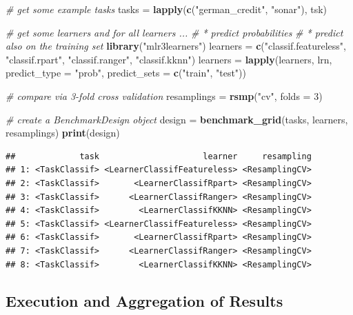 \documentclass[]{scrbook}
\newenvironment{Shaded}{\begin{snugshade}}{\end{snugshade}}
\newcommand{\CommentTok}[1]{\textcolor[rgb]{0.56,0.35,0.01}{\textit{#1}}}
\newcommand{\DataTypeTok}[1]{\textcolor[rgb]{0.13,0.29,0.53}{#1}}
\newcommand{\DecValTok}[1]{\textcolor[rgb]{0.00,0.00,0.81}{#1}}
\newcommand{\KeywordTok}[1]{\textcolor[rgb]{0.13,0.29,0.53}{\textbf{#1}}}
\newcommand{\NormalTok}[1]{#1}
\newcommand{\StringTok}[1]{\textcolor[rgb]{0.31,0.60,0.02}{#1}}
\renewenvironment{Shaded} {\begin{snugshade}\small} {\end{snugshade}}
\begin{document}
\begin{Shaded}
\begin{Highlighting}[]
\CommentTok{# get some example tasks}
\NormalTok{tasks =}\StringTok{ }\KeywordTok{lapply}\NormalTok{(}\KeywordTok{c}\NormalTok{(}\StringTok{"german_credit"}\NormalTok{, }\StringTok{"sonar"}\NormalTok{), tsk)}

\CommentTok{# get some learners and for all learners ...}
\CommentTok{# * predict probabilities}
\CommentTok{# * predict also on the training set}
\KeywordTok{library}\NormalTok{(}\StringTok{"mlr3learners"}\NormalTok{)}
\NormalTok{learners =}\StringTok{ }\KeywordTok{c}\NormalTok{(}\StringTok{"classif.featureless"}\NormalTok{, }\StringTok{"classif.rpart"}\NormalTok{, }\StringTok{"classif.ranger"}\NormalTok{, }\StringTok{"classif.kknn"}\NormalTok{)}
\NormalTok{learners =}\StringTok{ }\KeywordTok{lapply}\NormalTok{(learners, lrn,}
  \DataTypeTok{predict_type =} \StringTok{"prob"}\NormalTok{, }\DataTypeTok{predict_sets =} \KeywordTok{c}\NormalTok{(}\StringTok{"train"}\NormalTok{, }\StringTok{"test"}\NormalTok{))}

\CommentTok{# compare via 3-fold cross validation}
\NormalTok{resamplings =}\StringTok{ }\KeywordTok{rsmp}\NormalTok{(}\StringTok{"cv"}\NormalTok{, }\DataTypeTok{folds =} \DecValTok{3}\NormalTok{)}

\CommentTok{# create a BenchmarkDesign object}
\NormalTok{design =}\StringTok{ }\KeywordTok{benchmark_grid}\NormalTok{(tasks, learners, resamplings)}
\KeywordTok{print}\NormalTok{(design)}
\end{Highlighting}
\end{Shaded}

\begin{verbatim}
##             task                     learner     resampling
## 1: <TaskClassif> <LearnerClassifFeatureless> <ResamplingCV>
## 2: <TaskClassif>       <LearnerClassifRpart> <ResamplingCV>
## 3: <TaskClassif>      <LearnerClassifRanger> <ResamplingCV>
## 4: <TaskClassif>        <LearnerClassifKKNN> <ResamplingCV>
## 5: <TaskClassif> <LearnerClassifFeatureless> <ResamplingCV>
## 6: <TaskClassif>       <LearnerClassifRpart> <ResamplingCV>
## 7: <TaskClassif>      <LearnerClassifRanger> <ResamplingCV>
## 8: <TaskClassif>        <LearnerClassifKKNN> <ResamplingCV>
\end{verbatim}

\hypertarget{bm-exec}{%
\subsection{Execution and Aggregation of Results}\label{bm-exec}}
\end{document}
